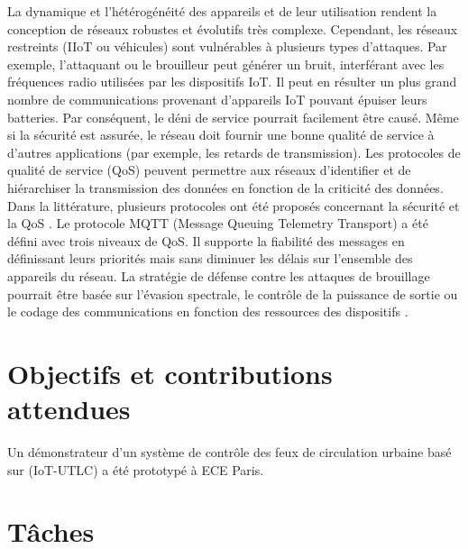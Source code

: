 La dynamique et l'hétérogénéité des appareils et de leur utilisation rendent la conception de réseaux robustes et évolutifs très complexe.
Cependant,
	les réseaux restreints (IIoT ou véhicules) sont vulnérables à plusieurs types d'attaques.
Par exemple,
	l'attaquant ou le brouilleur peut générer un bruit,
	interférant avec les fréquences radio utilisées par les dispositifs IoT.
Il peut en résulter un plus grand nombre de communications provenant d'appareils IoT pouvant épuiser leurs batteries.
Par conséquent,
	le déni de service pourrait facilement être causé.
Même si la sécurité est assurée,
	le réseau doit fournir une bonne qualité de service à d'autres applications (par exemple,
	les retards de transmission).
Les protocoles de qualité de service (QoS) peuvent permettre aux réseaux d'identifier et de hiérarchiser la transmission des données en fonction de la criticité des données.
Dans la littérature,
	plusieurs protocoles ont été proposés concernant la sécurité et la QoS \cite{simiscuka_relay_2018}.
Le protocole MQTT (Message Queuing Telemetry Transport) a été défini avec trois niveaux de QoS.
Il supporte la fiabilité des messages en définissant leurs priorités mais sans diminuer les délais sur l'ensemble des appareils du réseau.
La stratégie de défense contre les attaques de brouillage pourrait être basée sur l'évasion spectrale,
	le contrôle de la puissance de sortie ou le codage des communications en fonction des ressources des dispositifs \cite{xu_jamming_2006}\cite{stellios_survey_2018}.

\section{Objectifs et contributions attendues}

Un démonstrateur d'un système de contrôle des feux de circulation urbaine basé sur (IoT-UTLC) a été prototypé à ECE Paris.


\section{Tâches}



